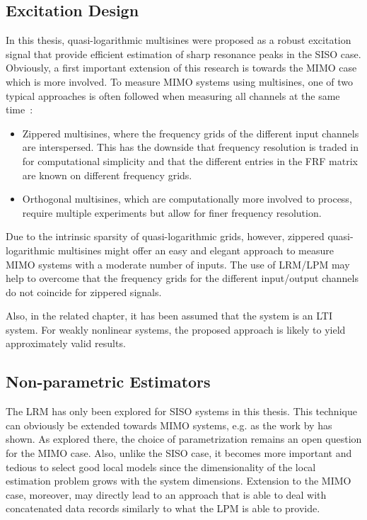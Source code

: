   \subsection{Excitation Design}
  In this thesis, quasi-logarithmic multisines were proposed as a robust excitation signal that provide efficient estimation of sharp resonance peaks in the \gls{SISO} case.
  Obviously, a first important extension of this research is towards the \gls{MIMO} case which is more involved.
  To measure \gls{MIMO} systems using multisines, one of two typical approaches is often followed when measuring all channels at the same time~\citep[Section 2.7]{Pintelon2012}:
  \begin{itemize}
    \item Zippered multisines, where the frequency grids of the different input channels are interspersed. This has the downside that frequency resolution is traded in for computational simplicity and that the different entries in the \gls{FRF} matrix are known on different frequency grids.
    \item Orthogonal multisines, which are computationally more involved to process, require multiple experiments but allow for finer frequency resolution.
  \end{itemize}
  Due to the intrinsic sparsity of quasi-logarithmic grids, however, zippered quasi-logarithmic multisines might offer an easy and elegant  approach to measure \gls{MIMO} systems with a moderate number of inputs.
  The use of \gls{LRM}/\gls{LPM} may help to overcome that the frequency grids for the different input/output channels do not coincide for zippered signals.

  Also, in the related chapter, it has been assumed that the system is an \gls{LTI} system.
  For weakly nonlinear systems, the proposed approach is likely to yield approximately valid results.

  \subsection{Non-parametric Estimators}
    The \gls{LRM} has only been explored for \gls{SISO} systems in this thesis.
    This technique can obviously be extended towards \gls{MIMO} systems, e.g. as the work by \citet{vanRietschoten2015MSc} has shown.
    As explored there, the choice of parametrization remains an open question for the \gls{MIMO} case.
    Also, unlike the \gls{SISO} case, it becomes more important and tedious to select good local models since the dimensionality of the local estimation problem grows with the system dimensions.
    Extension to the \gls{MIMO} case, moreover, may directly lead to an approach that is able to deal with concatenated data records similarly to what the \gls{LPM} is able to provide.

